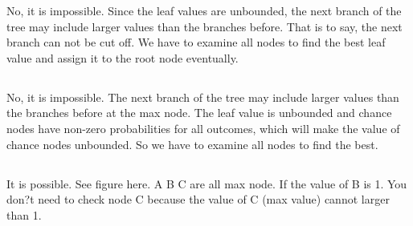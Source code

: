 \documentclass[12pt]{article}
\begin{document}
No, it is impossible. Since the leaf values are unbounded, the next branch of the tree may include larger values than the branches before. That is to say, the next branch can not be cut off. We have to examine all nodes to find the best leaf value and assign it to the root node eventually.


	
	\subsection{}
		\paragraph{}
No, it is impossible. The next branch of the tree may include larger values than the branches before at the max node.  The leaf value is unbounded and chance nodes have non-zero probabilities for all outcomes, which will make the value of chance nodes unbounded. So we have to examine all nodes to find the best.
		

	
	\subsection{}
		\paragraph{}

 It is possible. See figure here. A B C are all max node. If the value of B is 1. You don?t need to check node C because the value of C (max value) cannot larger than 1.
\end{document}
